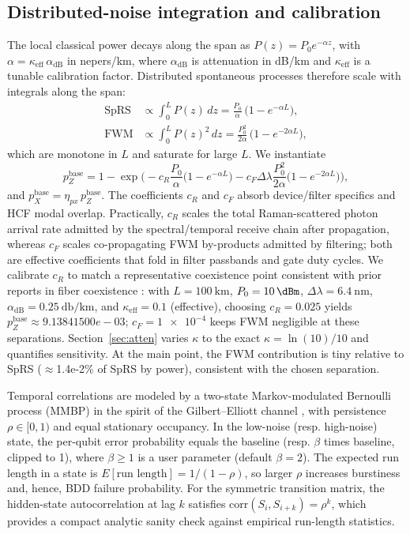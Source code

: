 \documentclass{article}
\newcommand{\nexact}[1]{#1}
\newcommand{\simpcl}{10}
\newcommand{\simsep}{6.4}
\newcommand{\simpz}{9.13841500e-03}
\newcommand{\simFWMFrac}{1.4e-2\%}
\begin{document}
\subsection{Distributed-noise integration and calibration}\label{sec:calib}
The local classical power decays along the span as \(P(z)=P_0 e^{-\alpha z}\), with \(\alpha = \kappa_{\mathrm{eff}}\,\alpha_{\mathrm{dB}}\) in nepers/km, where \(\alpha_{\mathrm{dB}}\) is attenuation in dB/km and \(\kappa_{\mathrm{eff}}\) is a tunable calibration factor. Distributed spontaneous processes therefore scale with integrals along the span:
\begin{align}
\mathrm{SpRS} &\propto \int_0^L P(z)\,dz = \frac{P_0}{\alpha}\,\big(1-e^{-\alpha L}\big),\\
\mathrm{FWM} &\propto \int_0^L P(z)^2\,dz = \frac{P_0^2}{2\alpha}\,\big(1-e^{-2\alpha L}\big),
\end{align}
which are monotone in \(L\) and saturate for large \(L\). We instantiate
\begin{equation}
p_Z^{\text{base}} = 1-\exp\!\Big(-c_R \frac{P_0}{\alpha}\big(1-e^{-\alpha L}\big) - c_F \Delta\lambda \frac{P_0^2}{2\alpha}\big(1-e^{-2\alpha L}\big)\Big),
\end{equation}
and \(p_X^{\text{base}}=\eta_{px}\,p_Z^{\text{base}}\). The coefficients \(c_R\) and \(c_F\) absorb device/filter specifics and HCF modal overlap. Practically, \(c_R\) scales the total Raman-scattered photon arrival rate admitted by the spectral/temporal receive chain after propagation, whereas \(c_F\) scales co-propagating FWM by-products admitted by filtering; both are effective coefficients that fold in filter passbands and gate duty cycles. We calibrate \(c_R\) to match a representative coexistence point consistent with prior reports in fiber coexistence \cite{Patel2012PRX,Kumar2015NJP,AgrawalNFO}: with \(L=\SI{100}{\kilo\meter}\), \(P_0=\SI{\simpcl}{\dBm}\), \(\Delta\lambda=\SI{\simsep}{\nano\meter}\), \(\alpha_{\mathrm{dB}}=\SI{0.25}{\decibel\per\kilo\meter}\), and \(\kappa_{\mathrm{eff}}=0.1\) (effective), choosing \(c_R=\num{0.025}\) yields \(p_Z^{\text{base}}\approx \nexact{\simpz}\); \(c_F=\num{1e-4}\) keeps FWM negligible at these separations. Section~\ref{sec:atten} varies \(\kappa\) to the exact \(\kappa=\ln(10)/10\) and quantifies sensitivity. At the main point, the FWM contribution is tiny relative to SpRS (\(\approx\)\simFWMFrac{} of SpRS by power), consistent with the chosen separation.

Temporal correlations are modeled by a two-state Markov-modulated Bernoulli process (MMBP) in the spirit of the Gilbert--Elliott channel \cite{Gilbert1960BSTJ,Elliott1963BSTJ}, with persistence \(\rho\in[0,1)\) and equal stationary occupancy. In the low-noise (resp. high-noise) state, the per-qubit error probability equals the baseline (resp. \(\beta\) times baseline, clipped to 1), where \(\beta\ge1\) is a user parameter (default \(\beta=2\)). The expected run length in a state is \(E[\text{run length}]=1/(1-\rho)\), so larger \(\rho\) increases burstiness and, hence, BDD failure probability. For the symmetric transition matrix, the hidden-state autocorrelation at lag \(k\) satisfies \(\mathrm{corr}(S_i,S_{i+k})=\rho^k\), which provides a compact analytic sanity check against empirical run-length statistics.
\end{document}
